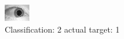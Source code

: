 \begin{figure}[h!]
\begin{center}
\includegraphics[width=0.60\columnwidth]{figures/ID1483_class_2_target_1.png}
\end{center}
\caption{ Classification: 2 actual target: 1}
\label{fig:ID1483_class_2_target_1}
\end{figure}
